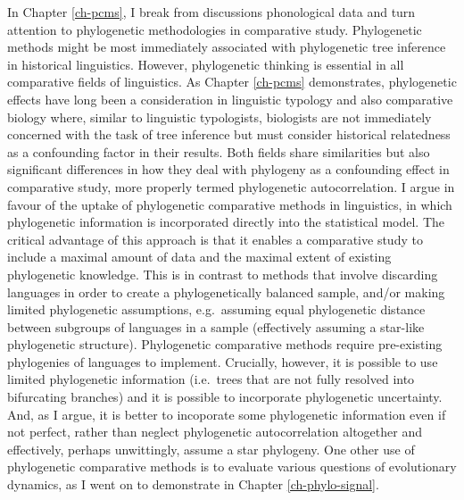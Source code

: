 In Chapter \ref{ch-pcms}, I break from discussions phonological data and turn attention to phylogenetic methodologies in comparative study. Phylogenetic methods might be most immediately associated with phylogenetic tree inference in historical linguistics. However, phylogenetic thinking is essential in all comparative fields of linguistics. As Chapter \ref{ch-pcms} demonstrates, phylogenetic effects have long been a consideration in linguistic typology and also comparative biology where, similar to linguistic typologists, biologists are not immediately concerned with the task of tree inference but must consider historical relatedness as a confounding factor in their results. Both fields share similarities but also significant differences in how they deal with phylogeny as a confounding effect in comparative study, more properly termed phylogenetic autocorrelation. I argue in favour of the uptake of phylogenetic comparative methods in linguistics, in which phylogenetic information is incorporated directly into the statistical model. The critical advantage of this approach is that it enables a comparative study to include a maximal amount of data and the maximal extent of existing phylogenetic knowledge. This is in contrast to methods that involve discarding languages in order to create a phylogenetically balanced sample, and/or making limited phylogenetic assumptions, e.g.~assuming equal phylogenetic distance between subgroups of languages in a sample (effectively assuming a star-like phylogenetic structure). Phylogenetic comparative methods require pre-existing phylogenies of languages to implement. Crucially, however, it is possible to use limited phylogenetic information (i.e.~trees that are not fully resolved into bifurcating branches) and it is possible to incorporate phylogenetic uncertainty. And, as I argue, it is better to incoporate some phylogenetic information even if not perfect, rather than neglect phylogenetic autocorrelation altogether and effectively, perhaps unwittingly, assume a star phylogeny. One other use of phylogenetic comparative methods is to evaluate various questions of evolutionary dynamics, as I went on to demonstrate in Chapter \ref{ch-phylo-signal}.

